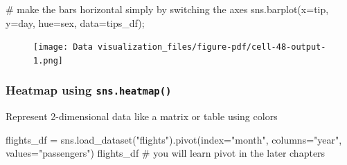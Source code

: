 \documentclass[
  letterpaper,
  DIV=11,
  numbers=noendperiod]{scrreprt}
\newenvironment{Shaded}{\begin{snugshade}}{\end{snugshade}}
\newcommand{\CommentTok}[1]{\textcolor[rgb]{0.37,0.37,0.37}{#1}}
\newcommand{\NormalTok}[1]{\textcolor[rgb]{0.00,0.23,0.31}{#1}}
\newcommand{\OperatorTok}[1]{\textcolor[rgb]{0.37,0.37,0.37}{#1}}
\newcommand{\StringTok}[1]{\textcolor[rgb]{0.13,0.47,0.30}{#1}}
\begin{document}
\begin{Shaded}
\begin{Highlighting}[]
\CommentTok{\# make the bars horizontal simply by switching the axes}
\NormalTok{sns.barplot(x}\OperatorTok{=}\StringTok{\textquotesingle{}tip\textquotesingle{}}\NormalTok{, y}\OperatorTok{=}\StringTok{\textquotesingle{}day\textquotesingle{}}\NormalTok{, hue}\OperatorTok{=}\StringTok{\textquotesingle{}sex\textquotesingle{}}\NormalTok{, data}\OperatorTok{=}\NormalTok{tips\_df)}\OperatorTok{;}
\end{Highlighting}
\end{Shaded}

\begin{figure}[H]

{\centering \texttt{[image: Data visualization\_files/figure-pdf/cell-48-output-1.png]}

}

\end{figure}

\hypertarget{heatmap-using-sns.heatmap}{%
\subsubsection{\texorpdfstring{Heatmap using
\texttt{sns.heatmap()}}{Heatmap using sns.heatmap()}}\label{heatmap-using-sns.heatmap}}

Represent 2-dimensional data like a matrix or table using colors

\begin{Shaded}
\begin{Highlighting}[]
\NormalTok{flights\_df }\OperatorTok{=}\NormalTok{ sns.load\_dataset(}\StringTok{"flights"}\NormalTok{).pivot(index}\OperatorTok{=}\StringTok{"month"}\NormalTok{, columns}\OperatorTok{=}\StringTok{"year"}\NormalTok{, values}\OperatorTok{=}\StringTok{"passengers"}\NormalTok{)}
\NormalTok{flights\_df}
\CommentTok{\# you will learn pivot in the later chapters}
\end{Highlighting}
\end{Shaded}
\end{document}
